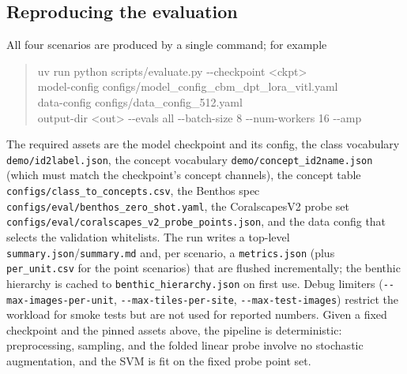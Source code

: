 \subsection{Reproducing the evaluation}
\label{sec:eval-repro}

All four scenarios are produced by a single command; for example
\begin{quote}\ttfamily
uv run python scripts/evaluate.py {-}{-}checkpoint <ckpt> \\
\quad {-}{-}model-config configs/model\_config\_cbm\_dpt\_lora\_vitl.yaml \\
\quad {-}{-}data-config configs/data\_config\_512.yaml \\
\quad {-}{-}output-dir <out> {-}{-}evals all {-}{-}batch-size 8 {-}{-}num-workers 16 {-}{-}amp
\end{quote}
The required assets are the model checkpoint and its config, the class vocabulary
\texttt{demo/id2label.json}, the concept vocabulary
\texttt{demo/concept\_id2name.json} (which must match the checkpoint's concept
channels), the concept table \texttt{configs/class\_to\_concepts.csv}, the
Benthos spec \texttt{configs/eval/benthos\_zero\_shot.yaml}, the CoralscapesV2
probe set \texttt{configs/eval/coralscapes\_v2\_probe\_points.json}, and the data
config that selects the validation whitelists. The run writes a top-level
\texttt{summary.json}/\texttt{summary.md} and, per scenario, a
\texttt{metrics.json} (plus \texttt{per\_unit.csv} for the point scenarios) that
are flushed incrementally; the benthic hierarchy is cached to
\texttt{benthic\_hierarchy.json} on first use. Debug limiters
(\texttt{{-}{-}max-images-per-unit}, \texttt{{-}{-}max-tiles-per-site},
\texttt{{-}{-}max-test-images}) restrict the workload for smoke tests but are not
used for reported numbers. Given a fixed checkpoint and the pinned assets above,
the pipeline is deterministic: preprocessing, sampling, and the folded linear
probe involve no stochastic augmentation, and the SVM is fit on the fixed probe
point set.
